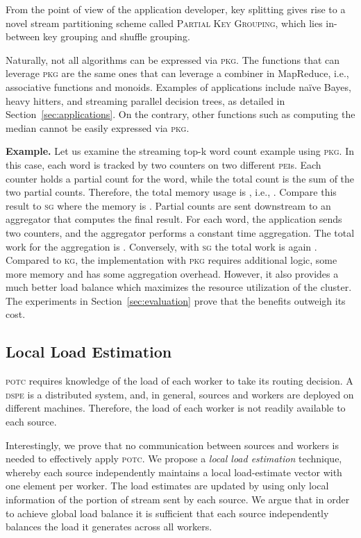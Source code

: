 \documentclass[10pt,conference,letterpaper]{IEEEtran}
\newcommand{\spara}[1]{\smallskip\noindent\textbf{#1}}
\newcommand{\pei}{\textsc{pei}\xspace}
\newcommand{\peis}{{\pei}s\xspace}
\newcommand{\potc}{\textsc{p\textup{o}tc}\xspace}
\newcommand{\dspe}{\textsc{dspe}\xspace}
\newcommand{\pkg}{\textsc{Partial Key Grouping}\xspace}
\newcommand{\pkgs}{\textsc{pkg}\xspace}
\newcommand{\kg}{\textsc{kg}\xspace}
\newcommand{\sg}{\textsc{sg}\xspace}
\begin{document}
From the point of view of the application developer, key splitting gives rise to  a novel stream partitioning scheme called \pkg, which lies in-between key grouping and shuffle grouping.


Naturally, not all algorithms can be expressed via \pkgs.
The functions that can leverage \pkgs are the same ones that can leverage a combiner in MapReduce, i.e., associative functions and monoids.
Examples of applications include na\"{i}ve Bayes, heavy hitters, and streaming parallel decision trees, as detailed in Section~\ref{sec:applications}.
On the contrary, other functions such as computing the median cannot be easily expressed via \pkgs.




\spara{Example.}
Let us examine the streaming top-k word count example using \pkgs.
In this case, each word is tracked by two counters on two different \peis. Each counter holds a partial count for the word, while the total count is the sum of the two partial counts.
Therefore, the total memory usage is , i.e., .
Compare this result to \sg where the memory is .
Partial counts are sent downstream to an aggregator that computes the final result.
For each word, the application sends two counters, and the aggregator performs a constant time aggregation.
The total work for the aggregation is .
Conversely, with \sg the total work is again .
Compared to \kg, the implementation with \pkgs requires additional logic, some more memory and has some aggregation overhead.
However, it also provides a much better load balance which maximizes the resource utilization of the cluster.
The experiments in Section~\ref{sec:evaluation} prove that the benefits outweigh its cost.







	



\subsection{Local Load Estimation}
\potc requires knowledge of the load of each worker to take its routing decision.
A \dspe is a distributed system, and, in general, sources and workers are deployed on different machines.
Therefore, the load of each worker is not readily available to each source.



Interestingly, we prove that no communication between sources and workers is needed to effectively apply \potc.
We propose a \emph{local load estimation} technique, whereby each source independently maintains a local load-estimate vector with one element per worker.
The load estimates are updated by using only local information of the portion of stream sent by each source.
We argue that in order to achieve global load balance it is sufficient that each source independently balances the load it generates across all workers.
\end{document}
